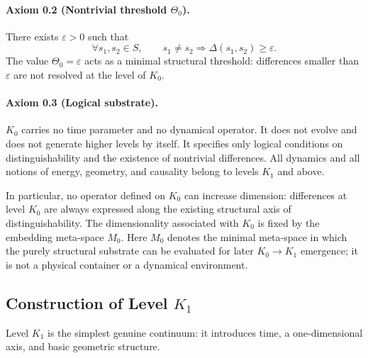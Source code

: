 \paragraph{Axiom 0.2 (Nontrivial threshold \texorpdfstring{$\Theta_0$}{Theta\_0}).}
There exists \(\varepsilon > 0\) such that
\[
    \forall s_1,s_2\in S,\qquad
    s_1 \neq s_2 \Rightarrow \Delta(s_1,s_2) \ge \varepsilon.
\]
The value \(\Theta_0 = \varepsilon\) acts as a minimal structural threshold: differences smaller than \(\varepsilon\) are not resolved at the level of \(K_0\).

\paragraph{Axiom 0.3 (Logical substrate).}
\(K_0\) carries no time parameter and no dynamical operator.
It does not evolve and does not generate higher levels by itself.
It specifies only logical conditions on distinguishability and the existence of nontrivial differences.
All dynamics and all notions of energy, geometry, and causality belong to levels \(K_1\) and above.

In particular, no operator defined on \(K_0\) can increase dimension:
differences at level \(K_0\) are always expressed along the existing structural axis of distinguishability.
The dimensionality associated with \(K_0\) is fixed by the embedding meta-space \(M_0\).
Here \(M_0\) denotes the minimal meta-space in which the purely structural
substrate can be evaluated for later \(K_0\to K_1\) emergence; it is not a
physical container or a dynamical environment.

\subsection{Construction of Level \texorpdfstring{$K_1$}{K\_1}}

Level \(K_1\) is the simplest genuine continuum: it introduces time, a one-dimensional axis, and basic geometric structure.

